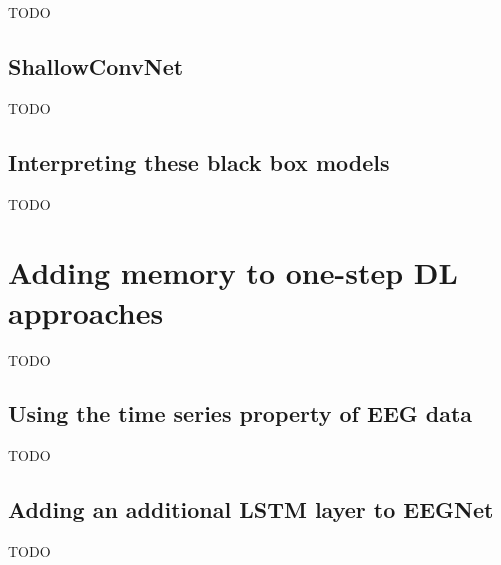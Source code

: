 TODO


\subsection{ShallowConvNet}
\label{subsec:offline_bci_system_one_step_dl_shallowconvnet}

TODO


\subsection{Interpreting these black box models}
\label{subsec:offline_bci_system_one_step_dl_interpreting}

TODO

\section{Adding memory to one-step DL approaches}
\label{sec:offline_bci_system_adding_memory}

TODO


\subsection{Using the time series property of EEG data}
\label{subsec:offline_bci_system_adding_memory_time_series}

TODO


\subsection{Adding an additional LSTM layer to EEGNet}
\label{subsec:offline_bci_system_adding_memory_lstm_eegnet}

TODO

